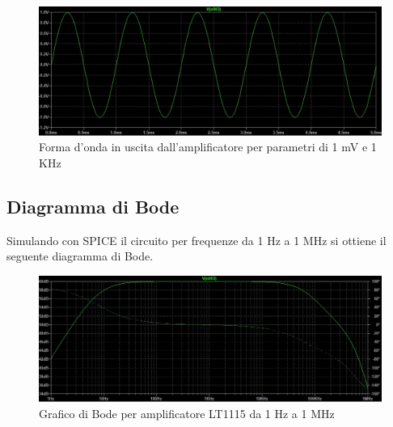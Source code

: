 \begin{figure}[h]
    \centering
    \includegraphics[width=1\textwidth]{Figure/Uscita 1.6.jpg}
    \caption{Forma d'onda in uscita dall'amplificatore per parametri di 1 mV e 1 KHz}
    \label{fig:UscitaCircuito}
\end{figure}

\subsection{Diagramma di Bode}\label{subsec:diagramma_bode_variante}
Simulando con SPICE il circuito per frequenze da 1 Hz a 1 MHz si ottiene il seguente diagramma di Bode.
\begin{figure}[h]
    \centering
    \includegraphics[width=1\textwidth]{Figure/Bode 1.7.jpg}
    \caption{Grafico di Bode per amplificatore LT1115 da 1 Hz a 1 MHz}
    \label{fig:bode_lt1115}
\end{figure}

\newpage
